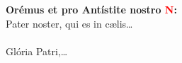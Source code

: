 \textbf{Orémus et pro Antístite nostro \textcolor{red}{N}:}\\
Pater noster, qui es in c{\ae}lis\ldots\\
\\
Glória Patri,\ldots